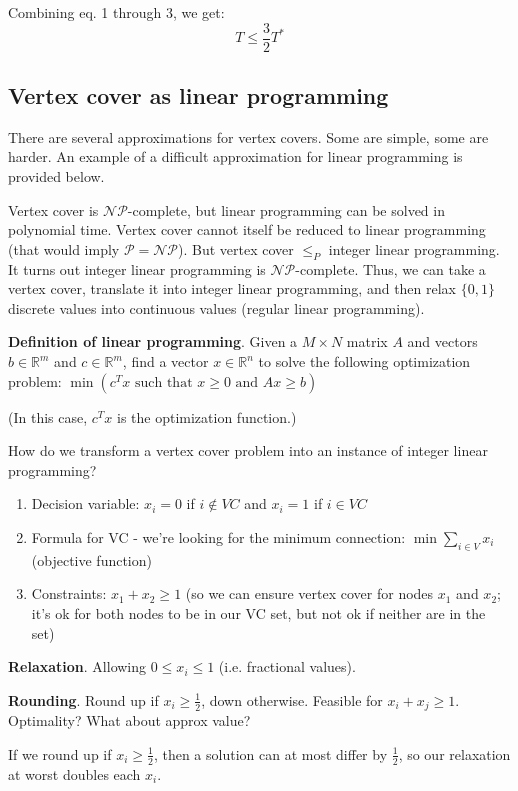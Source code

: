 \documentclass{article}
\begin{document}
Combining eq. 1 through 3, we get: $$T \leq \frac{3}{2} T^*$$

\subsection{Vertex cover as linear programming}
There are several approximations for vertex covers. Some are simple, some are harder. An example of a difficult approximation for linear programming is provided below.

Vertex cover is $\mathcal{NP}$-complete, but linear programming can be solved in polynomial time. Vertex cover cannot itself be reduced to linear programming (that would imply $\mathcal{P} = \mathcal{NP}$). But vertex cover $\leq_P$ integer linear programming. It turns out integer linear programming is $\mathcal{NP}$-complete. Thus, we can take a vertex cover, translate it into integer linear programming, and then relax $\{0, 1\}$ discrete values into continuous values (regular linear programming).

\textbf{Definition of linear programming}. Given a $M \times N$ matrix $A$ and vectors $b \in \mathbb{R}^m$ and $c \in \mathbb{R}^m$, find a vector $x \in \mathbb{R}^n$ to solve the following optimization problem: $\min(c^T x \text{ such that } x \geq 0 \text{ and } Ax \geq b)$

(In this case, $c^T x$ is the optimization function.)

How do we transform a vertex cover problem into an instance of integer linear programming?

\begin{enumerate}
    \item Decision variable: $x_i = 0$ if $i \notin VC$ and $x_i = 1$ if $i \in VC$
    \item Formula for VC - we're looking for the minimum connection: $\min \sum_{i \in V} x_i$ (objective function)
    \item Constraints: $x_1 + x_2 \geq 1$ (so we can ensure vertex cover for nodes $x_1$ and $x_2$; it's ok for both nodes to be in our VC set, but not ok if neither are in the set)
\end{enumerate}

\textbf{Relaxation}. Allowing $0 \leq x_i \leq 1$ (i.e. fractional values).

\textbf{Rounding}. Round up if $x_i \geq \frac{1}{2}$, down otherwise. Feasible for $x_i + x_j \geq 1$. Optimality? What about approx value?

If we round up if $x_i \geq \frac{1}{2}$, then a solution can at most differ by $\frac{1}{2}$, so our relaxation at worst doubles each $x_i$.
\end{document}
